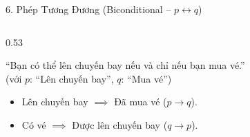 \documentclass[aspectratio=169, 10pt]{beamer}
\begin{document}
\begin{frame}{6. Phép Tương Đương (Biconditional -- $p \leftrightarrow q$)}
\begin{columns}[t, onlytextwidth]
\begin{column}{0.53\textwidth}
\begin{cozyInsight}
\begin{itemize}
          ``Bạn có thể lên chuyến bay nếu và chỉ nếu bạn mua vé.''\\
          {\footnotesize\color{cozyMuted}(với $p$: ``Lên chuyến bay'', $q$: ``Mua vé'')}
          \begin{itemize}
            \setlength{\itemsep}{2pt}
            \item Lên chuyến bay $\implies$ Đã mua vé ($p \to q$).
            \item Có vé $\implies$ Được lên chuyến bay ($q \to p$).
          \end{itemize}
        \end{itemize}
      \end{cozyInsight}
    \end{column}
  \end{columns}
\end{frame}
\end{document}
